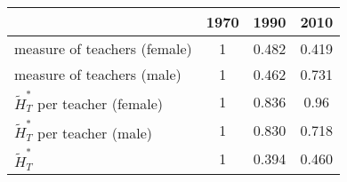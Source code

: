 \begin{table}
  \centering \begin{tabular}{lccc}
\toprule
& 1970 & 1990 & 2010 \\
\midrule
measure of teachers (female) & 1 & 0.482 &0.419\\
measure of teachers (male) & 1 & 0.462 & 0.731\\
$\widetilde{H}_T^*$ per teacher (female)   & 1 & 0.836 & 0.96 \\
$\widetilde{H}_T^*$ per teacher (male)   & 1 & 0.830 & 0.718 \\
$\widetilde{H}_T^*$ & 1  & 0.394 & 0.460 \\
\bottomrule
\end{tabular}
  \label{ }
\end{table}
